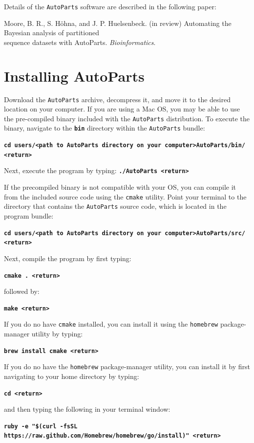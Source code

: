 \documentclass[11pt]{article}
\newcommand{\cl}[1]{{\texttt{\textbf{#1}}}}
\begin{document}
Details of the \verb!AutoParts! software are described in the following paper: \\ \vspace{-7mm}

\hangindent=1cm Moore, B. R., S. H\"{o}hna, and J. P. Huelsenbeck. (in review) Automating the Bayesian analysis of partitioned\\
sequence datasets with AutoParts. \emph{Bioinformatics}.

\bigskip
\section*{Installing AutoParts}

Download the \verb!AutoParts! archive, decompress it, and move it to the desired location on your computer.
If you are using a Mac OS, you may be able to use the pre-compiled binary included with the \verb!AutoParts! distribution.
To execute the binary, navigate to the \cl{bin} directory within the \verb!AutoParts! bundle:

\cl{cd users/<path to AutoParts directory on your computer>AutoParts/bin/ <return>}

Next, execute the program by typing:
\cl{./AutoParts <return>}

If the precompiled binary is not compatible with your OS, you can compile it from the included source code using the \verb!cmake! utility.
Point your terminal to the directory that contains the \verb!AutoParts! source code, which is located in the program bundle:

\cl{cd users/<path to AutoParts directory on your computer>AutoParts/src/ <return>}

Next, compile the program by first typing:

\cl{cmake . <return>}

followed by:

\cl{make <return>}

If you do no have \verb!cmake! installed, you can install it using the \verb!homebrew! package-manager utility by typing:

\cl{brew install cmake <return>}
  
If you do no have the \verb!homebrew! package-manager utility, you can install it by first navigating to your home directory by typing:

\cl{cd <return>}

and then typing the following in your terminal window:

\cl{ruby -e "\$(curl -fsSL https://raw.github.com/Homebrew/homebrew/go/install)" <return>}
\end{document}

